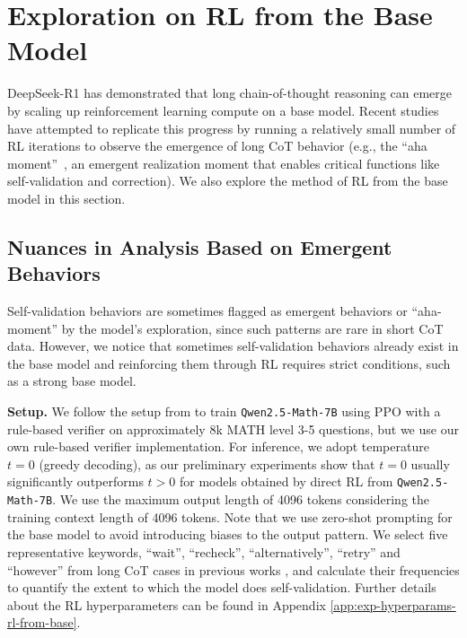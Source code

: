 \section{Exploration on RL from the Base Model}
\label{sec:rl-from-base}

DeepSeek-R1 \citep{deepseekai2025r1} has demonstrated that long chain-of-thought reasoning can emerge by scaling up reinforcement learning compute on a base model. Recent studies \citep{zeng2025simplerl, tinyzero} have attempted to replicate this progress by running a relatively small number of RL iterations to observe the emergence of long CoT behavior (e.g., the ``aha moment''~\citep{deepseekai2025r1}, an emergent realization moment that enables critical functions like self-validation and correction).
We also explore the method of RL from the base model in this section.

\subsection{Nuances in Analysis Based on Emergent Behaviors}
\label{result:base-reflections-existence}

Self-validation behaviors are sometimes flagged as emergent behaviors or ``aha-moment'' by the model's exploration, since such patterns are rare in short CoT data. However, we notice that sometimes self-validation behaviors already exist in the base model  and reinforcing them through RL requires strict conditions, such as a strong base model.

\noindent\textbf{Setup.}
We follow the setup from \citet{zeng2025simplerl} to train \texttt{Qwen2.5-Math-7B} using PPO  with a rule-based verifier on approximately 8k MATH level 3-5 questions, but we use our own rule-based verifier implementation. For inference, we adopt temperature $t = 0$ (greedy decoding), as our preliminary experiments show that $t=0$ usually significantly outperforms $t>0$ for models obtained by direct RL from \texttt{Qwen2.5-Math-7B}. We use the maximum output length of 4096 tokens considering the training context length of 4096 tokens. Note that we use zero-shot prompting for the base model to avoid introducing biases to the output pattern. We select five representative keywords, ``wait'', ``recheck'', ``alternatively'', ``retry'' and ``however'' from long CoT cases in previous works \citep{openai2024o1,deepseekai2025r1,tinyzero,zeng2025simplerl}, and calculate their frequencies to quantify the extent to which the model does self-validation. Further details about the RL hyperparameters can be found in Appendix \ref{app:exp-hyperparams-rl-from-base}.

